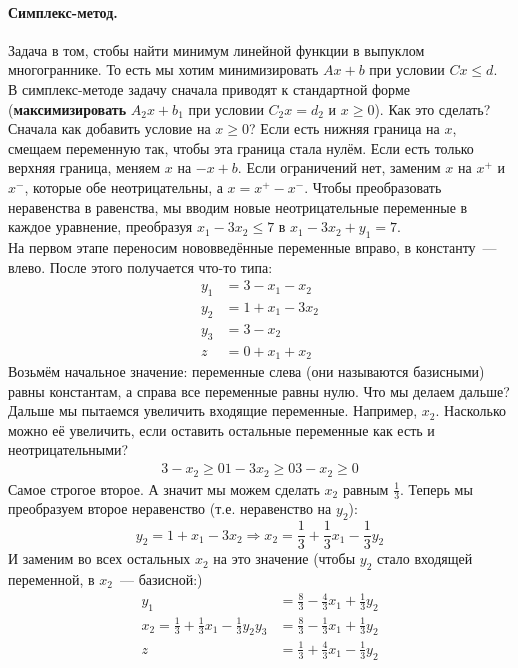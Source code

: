 \documentclass{article}
\begin{document}
    \paragraph{Симплекс-метод.}
    Задача в том, стобы найти минимум линейной функции в выпуклом многограннике. То есть мы хотим минимизировать $Ax+b$ при условии $Cx\leqslant d$.\\
    В симплекс-методе задачу сначала приводят к стандартной форме (\textbf{максимизировать} $A_2x+b_1$ при условии $C_2x=d_2$ и $x\geqslant0$). Как это сделать? Сначала как добавить условие на $x\geqslant0$? Если есть нижняя граница на $x$, смещаем переменную так, чтобы эта граница стала нулём. Если есть только верхняя граница, меняем $x$ на $-x+b$. Если ограничений нет, заменим $x$ на $x^+$ и $x^-$, которые обе неотрицательны, а $x=x^+-x^-$. Чтобы преобразовать неравенства в равенства, мы вводим новые неотрицательные переменные в каждое уравнение, преобразуя $x_1-3x_2\leqslant7$ в $x_1-3x_2+y_1=7$.\\
    На первом этапе переносим нововведённые переменные вправо, в константу~--- влево. После этого получается что-то типа:
    \[
    \begin{aligned}
        y_1&=3-x_1-x_2\\
        y_2&=1+x_1-3x_2\\
        y_3&=3-x_2\\
        z&=0+x_1+x_2
    \end{aligned}
    \]
    Возьмём начальное значение: переменные слева (они называются базисными) равны константам, а справа все переменные равны нулю. Что мы делаем дальше? Дальше мы пытаемся увеличить входящие переменные. Например, $x_2$. Насколько можно её увеличить, если оставить остальные переменные как есть и неотрицательными?
    \[
    \begin{aligned}
        3-x_2\geqslant0
        1-3x_2\geqslant0
        3-x_2\geqslant0
    \end{aligned}
    \]
    Самое строгое второе. А значит мы можем сделать $x_2$ равным $\frac13$. Теперь мы преобразуем второе неравенство (т.е. неравенство на $y_2$):
    \[
    y_2=1+x_1-3x_2\Longrightarrow x_2=\frac13+\frac13x_1-\frac13y_2
    \]
    И заменим во всех остальных $x_2$ на это значение (чтобы $y_2$ стало входящей переменной, в $x_2$~--- базисной:)
    \[
    \begin{aligned}
        y_1&=\frac83-\frac43x_1+\frac13y_2\\
        x_2=\frac13+\frac13x_1-\frac13y_2
        y_3&=\frac83-\frac13x_1+\frac13y_2\\
        z&=\frac13+\frac43x_1-\frac13y_2
    \end{aligned}
    \]
\end{document}
